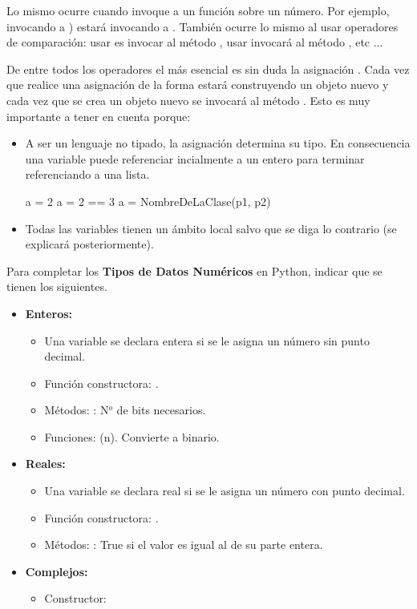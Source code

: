Lo mismo ocurre cuando invoque a un función sobre un número. Por ejemplo, invocando a ) estará invocando a .  También ocurre lo mismo al usar operadores de comparación: usar \cm{<} es invocar al método , usar \cm{==} invocará al método , etc ...

De entre todos los operadores el más esencial es sin duda la asignación \cm{=}. Cada vez que realice una asignación de la forma estará construyendo un objeto nuevo y cada vez que se crea un objeto nuevo se invocará al método . Esto es muy importante a tener en cuenta porque:

\begin{itemize}
\item A ser un lenguaje no tipado, la asignación determina su tipo. En consecuencia una variable puede referenciar incialmente a un entero para terminar referenciando a una lista.

\begin{pyverbatim}[][frame=single]
a = 2  %
a = 2 == 3  %
a = NombreDeLaClase(p1, p2) %
\end{pyverbatim}

 
 
\item Todas las variables tienen un ámbito local salvo que  se diga lo contrario (se explicará  posteriormente).
\end{itemize}

\noindent Para completar los \textbf{Tipos de Datos Numéricos} en  Python, indicar que se tienen los siguientes.

\begin{itemize}	
\item \textbf{Enteros:}
	\begin{itemize}
	\item Una variable se declara entera si se le asigna un número sin punto decimal.
	\item Función constructora: . 
	\item Métodos: : N$^o$ de bits necesarios.
	\item Funciones: (n). Convierte a binario.
	\end{itemize}
	
\item \textbf{Reales:}
	\begin{itemize}
	\item Una variable se declara real si se le asigna un número con punto decimal.
	\item Función constructora: . 
	\item Métodos: : True si el valor es igual al de su parte entera.
	\end{itemize}
	
\item \textbf{Complejos:}
	\begin{itemize}
	\item Constructor: 
	\end{itemize}
\end{itemize}

